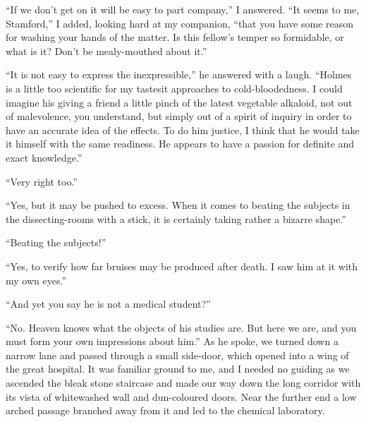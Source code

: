 \documentclass[12pt,english]{book}
\begin{document}
{}``If we don't get on it will be easy to part company,'' I answered.
{}``It seems to me, Stamford,'' I added, looking hard at my companion,
{}``that you have some reason for washing your hands of the matter.
Is this fellow's temper so formidable, or what is it? Don't be mealy-mouthed
about it.''

{}``It is not easy to express the inexpressible,'' he answered with
a laugh. {}``Holmes is a little too scientific for my tastes\mdsh{---}it
approaches to cold-bloodedness. I could imagine his giving a friend
a little pinch of the latest vegetable alkaloid, not out of malevolence,
you understand, but simply out of a spirit of inquiry in order to
have an accurate idea of the effects. To do him justice, I think that
he would take it himself with the same readiness. He appears to have
a passion for definite and exact knowledge.''

{}``Very right too.''

{}``Yes, but it may be pushed to excess. When it comes to beating
the subjects in the dissecting-rooms with a stick, it is certainly
taking rather a bizarre shape.''

{}``Beating the subjects!''

{}``Yes, to verify how far bruises may be produced after death. I
saw him at it with my own eyes.''

{}``And yet you say he is not a medical student?''

{}``No. Heaven knows what the objects of his studies are. But here
we are, and you must form your own impressions about him.'' As he
spoke, we turned down a narrow lane and passed through a small side-door,
which opened into a wing of the great hospital. It was familiar ground
to me, and I needed no guiding as we ascended the bleak stone staircase
and made our way down the long corridor with its vista of whitewashed
wall and dun-coloured doors. Near the further end a low arched passage
branched away from it and led to the chemical laboratory.
\end{document}
